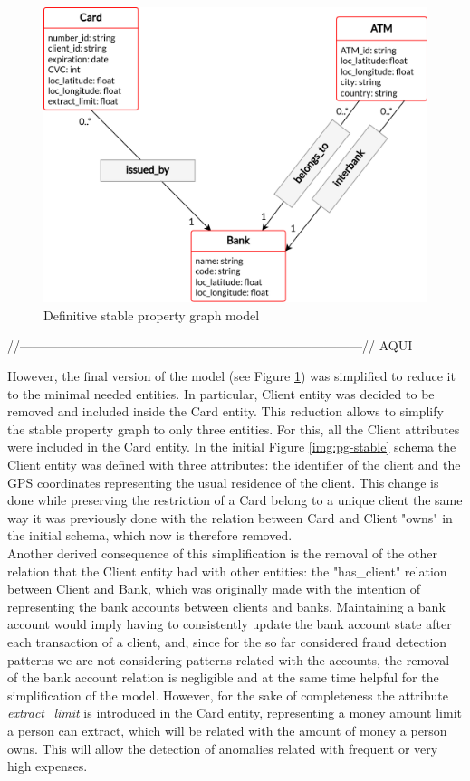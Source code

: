 \documentclass{article}
\begin{document}
\begin{figure}[H]
    \centering
    \includegraphics[scale = 0.7]{images/PG-stable-1-edit-cardinal.png}
    \caption{Definitive stable property graph model}
    \label{img:pg-stable-def}
\end{figure}

//---------------------------------------------------------------------------------//
AQUI

However, the final version of the model (see Figure \ref{img:pg-stable-def}) was simplified to reduce it to the minimal needed entities. In particular, Client entity was decided to be removed and included inside the Card entity. This reduction allows to simplify the stable property graph to only three entities. 
For this, all the Client attributes were included in the Card entity. In the initial Figure \ref{img:pg-stable} schema the Client entity was defined with three attributes: the identifier of the client and the GPS coordinates representing the usual residence of the client. This change is done while preserving the restriction of a Card belong to a unique client the same way it was previously done with the relation between Card and Client "owns" in the initial schema, which now is therefore removed. \\
Another derived consequence of this simplification is the removal of the other relation that the Client entity had with other entities: the "has\_client" relation between Client and Bank, which was originally made with the intention of representing the bank accounts between clients and banks. Maintaining a bank account would imply having to consistently update the bank account state after each transaction of a client, and, since for the so far considered fraud detection patterns we are not considering patterns related with the accounts, the removal of the bank account relation is negligible and at the same time helpful for the simplification of the model. However, for the sake of completeness the attribute \textit{extract\_limit} is introduced in the Card entity, representing a money amount limit a person can extract, which will be related with the amount of money a person owns. This will allow the detection of anomalies related with frequent or very high expenses.
\end{document}
